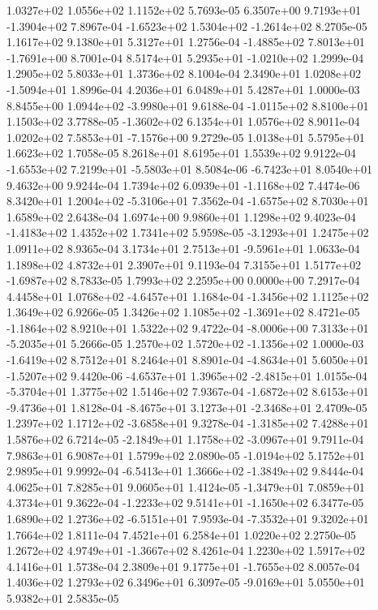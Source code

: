 1.0327e+02 1.0556e+02 1.1152e+02  5.7693e-05
 6.3507e+00  9.7193e+01 -1.3904e+02  7.8967e-04
-1.6523e+02  1.5304e+02 -1.2614e+02  8.2705e-05
1.1617e+02 9.1380e+01 5.3127e+01  1.2756e-04
-1.4885e+02  7.8013e+01 -1.7691e+00  8.7001e-04
 8.5174e+01  5.2935e+01 -1.0210e+02  1.2999e-04
1.2905e+02 5.8033e+01 1.3736e+02  8.1004e-04
 2.3490e+01  1.0208e+02 -1.5094e+01  1.8996e-04
4.2036e+01 6.0489e+01 5.4287e+01  1.0000e-03
 8.8455e+00  1.0944e+02 -3.9980e+01  9.6188e-04
-1.0115e+02  8.8100e+01  1.1503e+02  3.7788e-05
-1.3602e+02  6.1354e+01  1.0576e+02  8.9011e-04
 1.0202e+02  7.5853e+01 -7.1576e+00  9.2729e-05
1.0138e+01 5.5795e+01 1.6623e+02  1.7058e-05
8.2618e+01 8.6195e+01 1.5539e+02  9.9122e-04
-1.6553e+02  7.2199e+01 -5.5803e+01  8.5084e-06
-6.7423e+01  8.0540e+01  9.4632e+00  9.9244e-04
 1.7394e+02  6.0939e+01 -1.1168e+02  7.4474e-06
 8.3420e+01  1.2004e+02 -5.3106e+01  7.3562e-04
-1.6575e+02  8.7030e+01  1.6589e+02  2.6438e-04
1.6974e+00 9.9860e+01 1.1298e+02  9.4023e-04
-1.4183e+02  1.4352e+02  1.7341e+02  5.9598e-05
-3.1293e+01  1.2475e+02  1.0911e+02  8.9365e-04
 3.1734e+01  2.7513e+01 -9.5961e+01  1.0633e-04
1.1898e+02 4.8732e+01 2.3907e+01  9.1193e-04
 7.3155e+01  1.5177e+02 -1.6987e+02  8.7833e-05
1.7993e+02 2.2595e+00 0.0000e+00  7.2917e-04
 4.4458e+01  1.0768e+02 -4.6457e+01  1.1684e-04
-1.3456e+02  1.1125e+02  1.3649e+02  6.9266e-05
 1.3426e+02  1.1085e+02 -1.3691e+02  8.4721e-05
-1.1864e+02  8.9210e+01  1.5322e+02  9.4722e-04
-8.0006e+00  7.3133e+01 -5.2035e+01  5.2666e-05
 1.2570e+02  1.5720e+02 -1.1356e+02  1.0000e-03
-1.6419e+02  8.7512e+01  8.2464e+01  8.8901e-04
-4.8634e+01  5.6050e+01 -1.5207e+02  9.4420e-06
-4.6537e+01  1.3965e+02 -2.4815e+01  1.0155e-04
-5.3704e+01  1.3775e+02  1.5146e+02  7.9367e-04
-1.6872e+02  8.6153e+01 -9.4736e+01  1.8128e-04
-8.4675e+01  3.1273e+01 -2.3468e+01  2.4709e-05
 1.2397e+02  1.1712e+02 -3.6858e+01  9.3278e-04
-1.3185e+02  7.4288e+01  1.5876e+02  6.7214e-05
-2.1849e+01  1.1758e+02 -3.0967e+01  9.7911e-04
7.9863e+01 6.9087e+01 1.5799e+02  2.0890e-05
-1.0194e+02  5.1752e+01  2.9895e+01  9.9992e-04
-6.5413e+01  1.3666e+02 -1.3849e+02  9.8444e-04
4.0625e+01 7.8285e+01 9.0605e+01  1.4124e-05
-1.3479e+01  7.0859e+01  4.3734e+01  9.3622e-04
-1.2233e+02  9.5141e+01 -1.1650e+02  6.3477e-05
 1.6890e+02  1.2736e+02 -6.5151e+01  7.9593e-04
-7.3532e+01  9.3202e+01  1.7664e+02  1.8111e-04
7.4521e+01 6.2584e+01 1.0220e+02  2.2750e-05
 1.2672e+02  4.9749e+01 -1.3667e+02  8.4261e-04
1.2230e+02 1.5917e+02 4.1416e+01  1.5738e-04
 2.3809e+01  9.1775e+01 -1.7655e+02  8.0057e-04
1.4036e+02 1.2793e+02 6.3496e+01  6.3097e-05
-9.0169e+01  5.0550e+01  5.9382e+01  2.5835e-05
